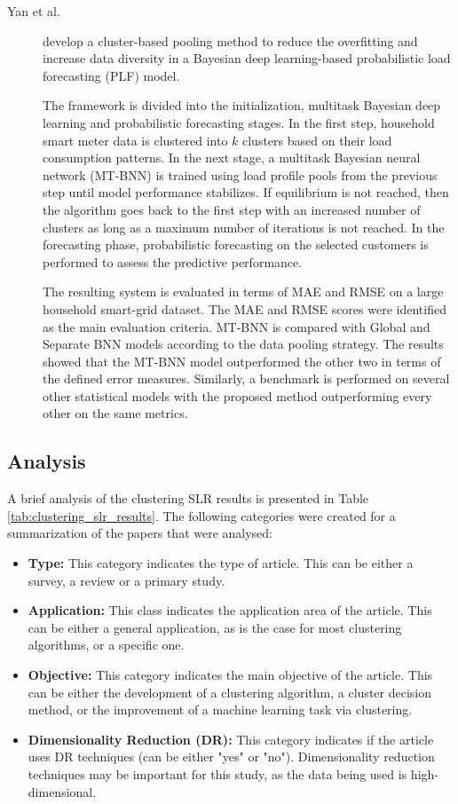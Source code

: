 \begin{description}
    \item[Yan et al.]\cite{Yang.Li.ea_BayesianDeepLearningBased_2020} develop a cluster-based pooling method to reduce the overfitting and increase data diversity in a Bayesian deep learning-based probabilistic load forecasting (PLF) model. 
    
    The framework is divided into the initialization, multitask Bayesian deep learning and probabilistic forecasting stages. In the first step, household smart meter data is clustered into $k$ clusters based on their load consumption patterns. In the next stage, a multitask Bayesian neural network (MT-BNN) is trained using load profile pools from the previous step until model performance stabilizes. If equilibrium is not reached, then the algorithm goes back to the first step with an increased number of clusters as long as a maximum number of iterations is not reached. In the forecasting phase, probabilistic forecasting on the selected customers is performed to assess the predictive performance.

    The resulting system is evaluated in terms of MAE and RMSE on a large household smart-grid dataset. The MAE and RMSE scores were identified as the main evaluation criteria. MT-BNN is compared with Global and Separate BNN models according to the data pooling strategy. The results showed that the MT-BNN model outperformed the other two in terms of the defined error measures. Similarly, a benchmark is performed on several other statistical models with the proposed method outperforming every other on the same metrics. 
\end{description}

\subsection{Analysis}\label{sec:sota_clustering_analysis}
A brief analysis of the clustering SLR results is presented in Table \ref{tab:clustering_slr_results}. The following categories were created for a summarization of the papers that were analysed:

\begin{itemize}
    \item \textbf{Type:} This category indicates the type of article. This can be either a survey, a review or a primary study.
    \item \textbf{Application:} This class indicates the application area of the article. This can be either a general application, as is the case for most clustering algorithms, or a specific one.
    \item \textbf{Objective:} This category indicates the main objective of the article. This can be either the development of a clustering algorithm, a cluster decision method, or the improvement of a machine learning task via clustering.
    \item \textbf{Dimensionality Reduction (DR):} This category indicates if the article uses DR techniques (can be either "yes" or "no"). Dimensionality reduction techniques may be important for this study, as the data being used is high-dimensional. 
\end{itemize}


